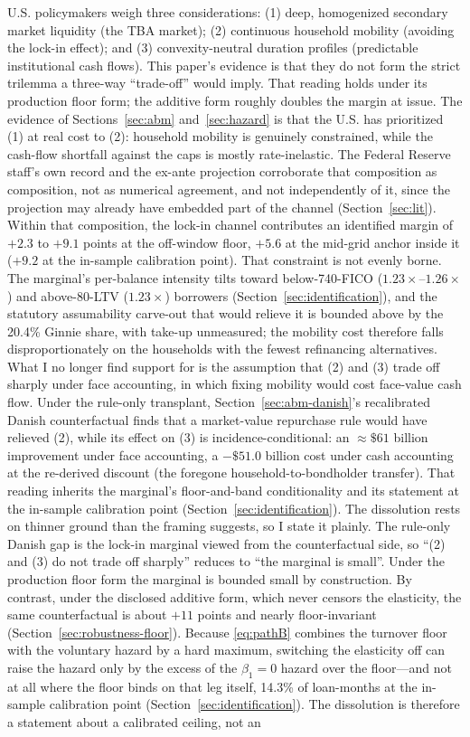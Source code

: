 \documentclass[12pt]{article}
\begin{document}
U.S. policymakers weigh three considerations: (1) deep, homogenized secondary market liquidity (the TBA market); (2) continuous household mobility (avoiding the lock-in effect); and (3) convexity-neutral duration profiles (predictable institutional cash flows). This paper's evidence is that they do not form the strict trilemma a three-way ``trade-off'' would imply. That reading holds under its production floor form; the additive form roughly doubles the margin at issue. The evidence of Sections~\ref{sec:abm} and~\ref{sec:hazard} is that the U.S. has prioritized (1) at real cost to (2): household mobility is genuinely constrained, while the cash-flow shortfall against the caps is mostly rate-inelastic. The Federal Reserve staff's own record and the ex-ante projection corroborate that composition as composition, not as numerical agreement, and not independently of it, since the projection may already have embedded part of the channel (Section~\ref{sec:lit}). Within that composition, the lock-in channel contributes an identified margin of $+2.3$ to $+9.1$ points at the off-window floor, $+5.6$ at the mid-grid anchor inside it ($+9.2$ at the in-sample calibration point). That constraint is not evenly borne. The marginal's per-balance intensity tilts toward below-740-FICO ($1.23\times$--$1.26\times$) and above-80-LTV ($1.23\times$) borrowers (Section~\ref{sec:identification}), and the statutory assumability carve-out that would relieve it is bounded above by the 20.4\% Ginnie share, with take-up unmeasured; the mobility cost therefore falls disproportionately on the households with the fewest refinancing alternatives. What I no longer find support for is the assumption that (2) and (3) trade off sharply under face accounting, in which fixing mobility would cost face-value cash flow. Under the rule-only transplant, Section~\ref{sec:abm-danish}'s recalibrated Danish counterfactual finds that a market-value repurchase rule would have relieved (2), while its effect on (3) is incidence-conditional: an $\approx\$61$ billion improvement under face accounting, a $-\$51.0$ billion cost under cash accounting at the re-derived discount (the foregone household-to-bondholder transfer). That reading inherits the marginal's floor-and-band conditionality and its statement at the in-sample calibration point (Section~\ref{sec:identification}). The dissolution rests on thinner ground than the framing suggests, so I state it plainly. The rule-only Danish gap is the lock-in marginal viewed from the counterfactual side, so ``(2) and (3) do not trade off sharply'' reduces to ``the marginal is small''. Under the production floor form the marginal is bounded small by construction. By contrast, under the disclosed additive form, which never censors the elasticity, the same counterfactual is about $+11$ points and nearly floor-invariant (Section~\ref{sec:robustness-floor}). Because \eqref{eq:pathB} combines the turnover floor with the voluntary hazard by a hard maximum, switching the elasticity off can raise the hazard only by the excess of the $\beta_1 = 0$ hazard over the floor---and not at all where the floor binds on that leg itself, 14.3\% of loan-months at the in-sample calibration point (Section~\ref{sec:identification}). The dissolution is therefore a statement about a calibrated ceiling, not an 
\end{document}
